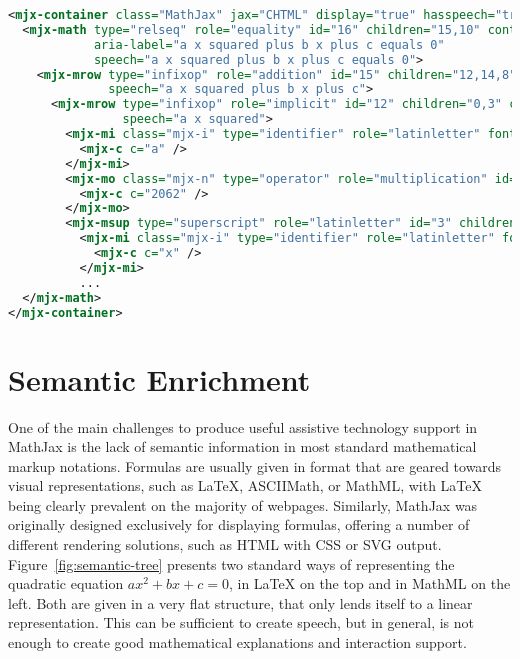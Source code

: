 \documentclass{sig-alternate}
\begin{document}
\begin{figure*}[h!]
  \begin{lstlisting}[language=XML,basicstyle=\scriptsize\tt]
<mjx-container class="MathJax" jax="CHTML" display="true" hasspeech="true" tabindex="1">
  <mjx-math type="relseq" role="equality" id="16" children="15,10" content="9"
            aria-label="a x squared plus b x plus c equals 0" 
            speech="a x squared plus b x plus c equals 0">
    <mjx-mrow type="infixop" role="addition" id="15" children="12,14,8" content="4,7" parent="16"
              speech="a x squared plus b x plus c">
      <mjx-mrow type="infixop" role="implicit" id="12" children="0,3" content="11" parent="15"
                speech="a x squared">
        <mjx-mi class="mjx-i" type="identifier" role="latinletter" font="italic" id="0" parent="12" speech="a">
          <mjx-c c="a" />
        </mjx-mi>
        <mjx-mo class="mjx-n" type="operator" role="multiplication" id="11" parent="12" speech="times">
          <mjx-c c="2062" />
        </mjx-mo>
        <mjx-msup type="superscript" role="latinletter" id="3" children="1,2" parent="12" speech="x squared">
          <mjx-mi class="mjx-i" type="identifier" role="latinletter" font="italic" id="1" parent="3" speech="x">
            <mjx-c c="x" />
          </mjx-mi>
          ...
  </mjx-math>
</mjx-container>
\end{lstlisting}
\caption{Rendered quadratic equation in MathJax v3 with embedded
  semantic tree and speech.}
\label{fig:rendered}
\end{figure*}



\section{Semantic Enrichment}
\label{sec:semantic-enrichment}

One of the main challenges to produce useful assistive technology support in
MathJax is the lack of semantic information in most standard mathematical markup
notations. Formulas are usually given in format that are geared towards visual
representations, such as {\LaTeX}, ASCIIMath, or MathML, with
{\LaTeX} being clearly prevalent on the majority of webpages. Similarly, MathJax was
originally designed exclusively for displaying formulas, offering a number of
different rendering solutions, such as HTML with CSS or SVG output.
Figure~\ref{fig:semantic-tree} presents two standard ways of representing the
quadratic equation $ax^2 + bx + c = 0$, in {\LaTeX} on the top and in MathML on
the left. Both are given in a very flat structure, that only lends itself to a
linear representation. This can be sufficient to create speech, but in
general, is not enough to create good mathematical explanations and interaction
support.
\end{document}
